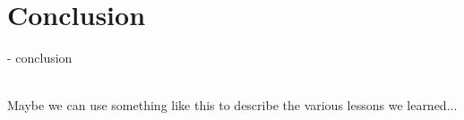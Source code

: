 \documentclass{report}
\begin{document}
\chapter{Conclusion}
- conclusion








\begin{framed}
 \\
Maybe we can use something like this to describe the various lessons we
learned...
\end{framed}


\end{document}
